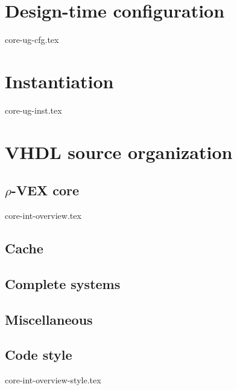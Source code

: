 \documentclass[11pt,twoside]{ce}
\newcommand{\rvex}{\texorpdfstring{$\rho$}{r}-VEX}
\begin{document}
\chapter{Design-time configuration}
{core-ug-cfg.tex}

\chapter{Instantiation}
{core-ug-inst.tex}


\let\subsection\actualsubsection
\let\subsubsection\actualsubsubsection
\let\paragraph\actualparagraph

\chapter{VHDL source organization}

\section{\rvex{} core}
\newcommand{\coreoverviewintro}{\relax}
{core-int-overview.tex}

\section{Cache}

\section{Complete systems}

\section{Miscellaneous}

\section{Code style}
{core-int-overview-style.tex}






\end{document}
